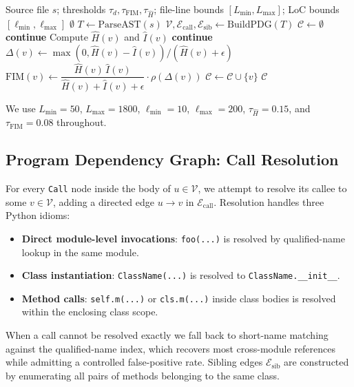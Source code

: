 \begin{algorithm}[h]
\caption{Single-function FIM target selection for one file.}
\label{alg:selection}
\begin{algorithmic}[1]
  \Require Source file $s$; thresholds $\tau_d, \tau_{\mathrm{FIM}}, \tau_{\hat H}$;
           file-line bounds $[L_{\min}, L_{\max}]$; LoC bounds $[\ell_{\min}, \ell_{\max}]$
     \State \Return $\emptyset$ 
  \EndIf
  \State $T \gets \mathrm{ParseAST}(s)$
  \State $\mathcal{V}, \mathcal{E}_{\mathrm{call}}, \mathcal{E}_{\mathrm{sib}} \gets \mathrm{BuildPDG}(T)$
  \State $\mathcal{C} \gets \emptyset$
      \State \textbf{continue}
    \EndIf
    \State Compute $\hat{H}(v)$ and $\hat{I}(v)$
     \textbf{continue} \EndIf
    \State $\Delta(v) \gets \max(0, \hat{H}(v)-\hat{I}(v)) / (\hat{H}(v)+\epsilon)$
    \State $\mathrm{FIM}(v) \gets \dfrac{\hat{H}(v)\,\hat{I}(v)}{\hat{H}(v)+\hat{I}(v)+\epsilon}\cdot \rho(\Delta(v))$
      \State $\mathcal{C} \gets \mathcal{C} \cup \{v\}$
    \EndIf
  \EndFor
  \State \Return $\mathcal{C}$ 
\end{algorithmic}
\end{algorithm}

We use $L_{\min}=50$, $L_{\max}=1800$, $\ell_{\min}=10$, $\ell_{\max}=200$,
$\tau_{\hat H}=0.15$, and $\tau_{\mathrm{FIM}}=0.08$ throughout.

\subsection{Program Dependency Graph: Call Resolution}
\label{app:algo:pdg}

For every \texttt{Call} node inside the body of $u \in \mathcal{V}$, we
attempt to resolve its callee to some $v \in \mathcal{V}$, adding a
directed edge $u \to v$ in $\mathcal{E}_{\mathrm{call}}$. Resolution
handles three Python idioms:
\begin{itemize}\setlength\itemsep{0.1em}
  \item \textbf{Direct module-level invocations}: \texttt{foo(...)} is
        resolved by qualified-name lookup in the same module.
  \item \textbf{Class instantiation}: \texttt{ClassName(...)} is
        resolved to \texttt{ClassName.\_\_init\_\_}.
  \item \textbf{Method calls}: \texttt{self.m(...)} or \texttt{cls.m(...)}
        inside class bodies is resolved within the enclosing class scope.
\end{itemize}
When a call cannot be resolved exactly we fall back to short-name
matching against the qualified-name index, which recovers most
cross-module references while admitting a controlled false-positive rate.
Sibling edges $\mathcal{E}_{\mathrm{sib}}$ are constructed by
enumerating all pairs of methods belonging to the same class.

